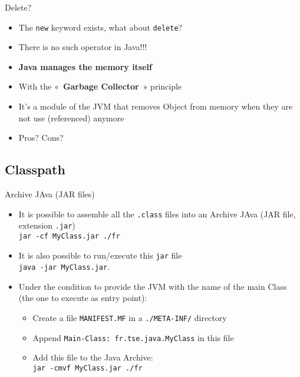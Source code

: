 \documentclass[English,c,%
hyperref={%
    pdftitle={FISA-DE2 OOP in Java},%
    pdfauthor={Muller, Gravier, Laforest, Subercaze},%
    pdfsubject={OOP in Java},%
    pdfkeywords={OOP, Java}%
    },%
xcolor={pdftex,svgnames} %
]{beamer}
\begin{document}
\begin{frame}[fragile]{Delete?}
  \vspace{.2em}
\begin{itemize}
    \item The \texttt{new} keyword exists, what about \texttt{delete}?
    \pause
    \item There is no such operator in Java!!!
    \item \textbf{Java manages the memory itself}
    \item With the «~\textbf{Garbage Collector}~» principle
    \item It's a module of the JVM that removes Object from memory when they are not use (referenced) anymore
    \medskip
    \item Pros? Cons?
\end{itemize}
\pause
{}
\end{frame}


\subsection{Classpath}


\begin{frame}{Archive JAva (JAR files)}
\begin{itemize}
    \item It is possible to assemble all the \texttt{.class} files into an Archive JAva (JAR file, extension \texttt{.jar})\\
    \texttt{jar -cf MyClass.jar ./fr}
    \pause
    \item It is also possible to run/execute this \texttt{jar} file\\
    \texttt{java -jar MyClass.jar}.
    \pause
    \item Under the condition to provide the JVM with the name of the main Class (the one to execute as entry point):
    \begin{itemize}
      \item Create a file \texttt{MANIFEST.MF} in a \texttt{./META-INF/} directory
      \item Append \texttt{Main-Class: fr.tse.java.MyClass} in this file
      \item Add this file to the Java Archive:\\
      \texttt{jar -cmvf  MyClass.jar ./fr}
    \end{itemize}
\end{itemize}
\end{frame}
\end{document}
